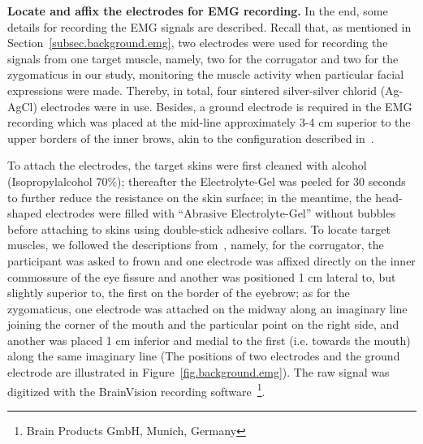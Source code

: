 \textbf{Locate and affix the electrodes for EMG recording.}
In the end, some details for recording the EMG signals are described. Recall that, as mentioned in Section~\ref{subsec.background.emg}, two electrodes were used for recording the signals from one target muscle, namely, two for the corrugator and two for the zygomaticus in our study, monitoring the muscle activity when particular facial expressions were made. Thereby, in total, four sintered silver-silver chlorid (Ag-AgCl) electrodes were in use.
Besides, 
a ground electrode is required in the EMG recording which was placed at the mid-line approximately 3-4 cm superior to the upper borders of the inner brows, akin to the configuration described in~\citep{fridlund1986guidelines}.

To attach the electrodes, 
the target skins were first 
cleaned with alcohol (Isopropylalcohol 70\%); thereafter the Electrolyte-Gel was peeled for 30 seconds to further reduce the resistance on the skin surface;
in the meantime, the head-shaped electrodes were filled with ``Abrasive Electrolyte-Gel'' without bubbles before attaching to skins using double-stick adhesive collars.  
To locate target muscles, 
we followed the descriptions from~\citep{fridlund1986guidelines}, namely,
for the corrugator, 
the participant was asked to frown and  
one electrode was affixed directly on the inner commossure of the eye fissure and another was positioned 1 cm lateral to, but slightly superior to, the first on the border of the eyebrow;
as for the zygomaticus, 
one electrode was attached on 
the midway along an imaginary line joining the corner of the mouth and the particular point on the right side, and another was placed 1 cm inferior and medial to the first (i.e. towards the mouth) along the same imaginary line (The positions of two electrodes and the ground electrode are illustrated in Figure~\ref{fig.background.emg}). The raw signal was digitized with the BrainVision recording software~\footnote{Brain Products GmbH, Munich, Germany}.
		

